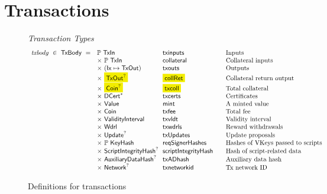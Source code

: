 \section{Transactions}
\label{sec:transactions}
\begin{figure*}[htb]
  \emph{Transaction Types}
  \begin{equation*}
    \begin{array}{r@{~~}l@{~~}l@{\qquad}l}
      \var{txbody} ~\in~ \TxBody ~=~
      & \powerset{\TxIn} & \fun{txinputs}& \text{Inputs}\\
      & \times ~\powerset{\TxIn} & \fun{collateral} & \text{Collateral inputs}\\
      & \times ~(\Ix \mapsto \TxOut) & \fun{txouts}& \text{Outputs}\\
      & \times ~\hldiff{\TxOut^?} & \hldiff{\fun{collRet}} & \text{Collateral return output}\\
      & \times ~\hldiff{\Coin^?} & \hldiff{\fun{txcoll}} & \text{Total collateral}\\
      & \times~ \seqof{\DCert} & \fun{txcerts}& \text{Certificates}\\
       & \times ~\Value  & \fun{mint} &\text{A minted value}\\
       & \times ~\Coin & \fun{txfee} &\text{Total fee}\\
       & \times ~\ValidityInterval & \fun{txvldt} & \text{Validity interval}\\
       & \times~ \Wdrl  & \fun{txwdrls} &\text{Reward withdrawals}\\
       & \times ~\Update^?  & \fun{txUpdates} & \text{Update proposals}\\
       & \times ~\powerset{\KeyHash} & \fun{reqSignerHashes} & \text{Hashes of VKeys passed to scripts}\\
       & \times ~\ScriptIntegrityHash^? & \fun{scriptIntegrityHash} & \text{Hash of script-related data}\\
       & \times ~\AuxiliaryDataHash^? & \fun{txADhash} & \text{Auxiliary data hash}\\
       & \times ~\Network^? & \fun{txnetworkid} & \text{Tx network ID}\\
    \end{array}
  \end{equation*}
  \caption{Definitions for transactions}
  \label{fig:defs:utxo-shelley-2}
\end{figure*}
